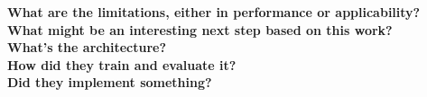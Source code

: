 
\noindent\textbf{\large What are the limitations, either in performance or applicability?}
\\

\noindent\textbf{\large What might be an interesting next step based on this work?}
\\

\noindent\textbf{\large What's the architecture?}
\\

\noindent\textbf{\large How did they train and evaluate it?}
\\

\noindent\textbf{\large Did they implement something?}
\\

